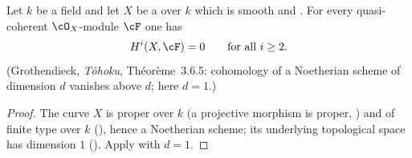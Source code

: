 \begin{lemma}
\label{lem:pc-vanishing-above-dim}
Let $k$ be a field and let $X$ be a
 over $k$ which is smooth and
.  For every
quasi-coherent $\cO_X$-module $\cF$ one has
\[
H^i(X,\cF)=0\qquad\text{for all }i\ge2 .
\]
(Grothendieck, \emph{Tôhoku}, Théorème~3.6.5: cohomology of a
Noetherian scheme of dimension $d$ vanishes above $d$; here $d=1$.)
\end{lemma}
\begin{proof}
The curve $X$ is proper over $k$ (a projective morphism is proper,
) and of finite type over $k$
(), hence a Noetherian scheme; its underlying
topological space has dimension $1$ ().  Apply
 with $d=1$.
\end{proof}

